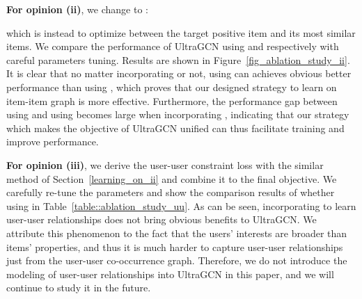 \documentclass[sigconf,authorversion]{acmart}
\begin{document}
\begin{table}[!t]
\centering
\caption{Performance comparison of whether learning on the user-user co-occurrence graph.}
\label{table::ablation_study_uu}
\end{table}


\textbf{For opinion (ii)}, we change  to :

which is instead to optimize between the target positive item and its most  similar items. We compare the performance of UltraGCN using  and  respectively with careful parameters tuning. Results are shown in Figure~\ref{fig_ablation_study_ii}. It is clear that no matter incorporating  or not, using  can achieves obvious better performance than using , which proves that our designed strategy to learn on item-item graph is more effective. Furthermore, the performance gap between using  and using  becomes large when incorporating , indicating that our strategy which makes the objective of UltraGCN unified can thus facilitate training and improve performance. 

\textbf{For opinion (iii)}, we derive the user-user constraint loss  with the similar method of Section~\ref{learning_on_ii} and combine it to the final objective. We carefully re-tune the parameters and show the comparison results of whether using  in Table~\ref{table::ablation_study_uu}. 
As can be seen, incorporating  to learn user-user relationships does not bring obvious benefits to UltraGCN. We attribute this phenomenon to the fact that the users' interests are broader than items' properties, and thus it is much harder to capture user-user relationships just from the user-user co-occurrence graph. Therefore, we do not introduce the modeling of user-user relationships into UltraGCN in this paper, and we will continue to study it in the future.
\end{document}
